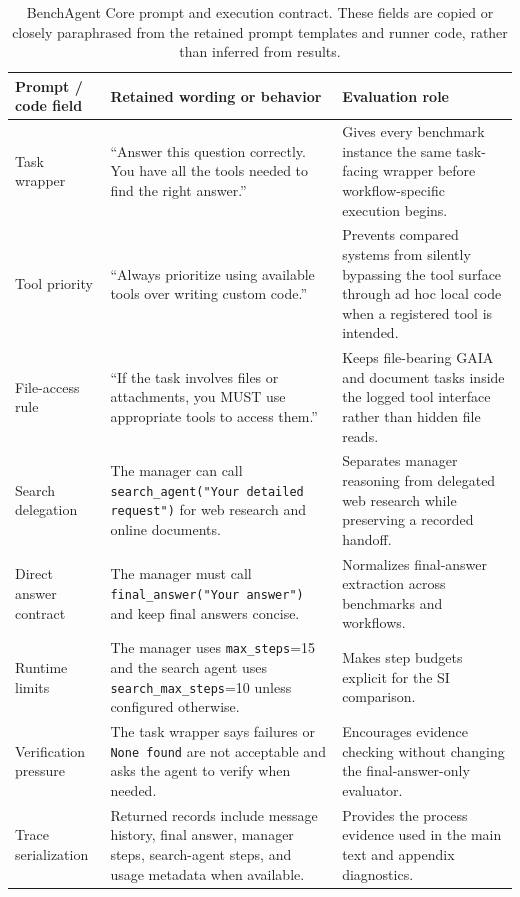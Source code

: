 \begin{table}[t]
    \centering
    \caption{BenchAgent Core prompt and execution contract. These fields are copied or closely paraphrased from the retained prompt templates and runner code, rather than inferred from results.}
    \label{tab:appendix_benchagent_core_prompt}
    \footnotesize
    \setlength{\tabcolsep}{4pt}
    \renewcommand{\arraystretch}{1.08}
    \begin{tabular}{p{}p{}p{}}
        \toprule
        \textbf{Prompt / code field} & \textbf{Retained wording or behavior} & \textbf{Evaluation role} \\
        \midrule
        Task wrapper & ``Answer this question correctly. You have all the tools needed to find the right answer.'' & Gives every benchmark instance the same task-facing wrapper before workflow-specific execution begins. \\
        Tool priority & ``Always prioritize using available tools over writing custom code.'' & Prevents compared systems from silently bypassing the tool surface through ad hoc local code when a registered tool is intended. \\
        File-access rule & ``If the task involves files or attachments, you MUST use appropriate tools to access them.'' & Keeps file-bearing GAIA and document tasks inside the logged tool interface rather than hidden file reads. \\
        Search delegation & The manager can call \texttt{search\_agent("Your detailed request")} for web research and online documents. & Separates manager reasoning from delegated web research while preserving a recorded handoff. \\
        Direct answer contract & The manager must call \texttt{final\_answer("Your answer")} and keep final answers concise. & Normalizes final-answer extraction across benchmarks and workflows. \\
        Runtime limits & The manager uses \texttt{max\_steps}=15 and the search agent uses \texttt{search\_max\_steps}=10 unless configured otherwise. & Makes step budgets explicit for the SI comparison. \\
        Verification pressure & The task wrapper says failures or \texttt{None found} are not acceptable and asks the agent to verify when needed. & Encourages evidence checking without changing the final-answer-only evaluator. \\
        Trace serialization & Returned records include message history, final answer, manager steps, search-agent steps, and usage metadata when available. & Provides the process evidence used in the main text and appendix diagnostics. \\
        \bottomrule
    \end{tabular}
    \renewcommand{\arraystretch}{1.0}
\end{table}

